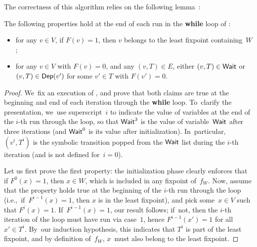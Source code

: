 The correctness of this algorithm relies on the following lemma~\cite{LS98}:
\begin{lemma}[Invariant]\label{9-lemma:ls98}
  The following properties hold at the end of each run in the
  \textbf{while} loop of :
  \begin{itemize}
  \item for any $v\in V$, if $F(v)=1$, then $v$ belongs to the least
    fixpoint containing~$W$;
  \item for any $v\in V$ with $F(v)=0$, and any $(v,T)\in E$, either
    $(v,T)\in \textsf{Wait}$ or $(v,T)\in\textsf{Dep}(v')$ for some $v'\in T$ with
    $F(v')=0$.
  \end{itemize}
\end{lemma}

\begin{proof}
  We~fix an execution of , and prove that both
  claims are true at the beginning and end of each iteration through
  the \textbf{while} loop. To~clarify the presentation, we~use
  superscript~$i$ to indicate the value of variables at the end of the
  $i$-th run through the loop, so that $\textsf{Wait}^3$ is the value of
  variable~$\textsf{Wait}$ after three iterations (and $\textsf{Wait}^0$ is its value
  after initialization). In~particular, $(v^i,T^i)$ is the
  symbolic transition popped from the $\textsf{Wait}$ list during the $i$-th
  iteration (and is not defined for~$i=0$).

  Let us first prove the first property: the initialization phase
  clearly enforces that if $F^0(x)=1$, then $x\in W$, which is
  included in any fixpoint of~$f_W$. Now, assume that the property
  holds true at the beginning of the $i$-th run through the loop
  (i.e.,~if~$F^{i-1}(x)=1$, then $x$ is in the least fixpoint), and
  pick some~$x\in V$ such that $F^i(x)=1$. If~$F^{i-1}(x)=1$, our
  result follows; if~not, then the $i$-th iteration of the loop must
  have run via case~$1$, hence $F^{i-1}(x')=1$ for all~$x'\in
  T^i$. By~our induction hypothesis, this indicates that $T^i$ is part
  of the least fixpoint, and by definition of~$f_W$, $x$~must also
  belong to the least fixpoint.



\end{proof}
